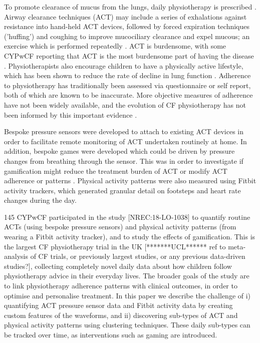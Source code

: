 \documentclass{article}
\begin{document}
To promote clearance of mucus from the lungs, daily physiotherapy is prescribed \cite{Daniels2017}. Airway clearance techniques (ACT) may include a series of  exhalations against resistance into hand-held ACT devices, followed by forced expiration techniques ('huffing') and coughing to improve mucociliary clearance and expel mucous; an exercise which is performed repeatedly \cite{Villanuevaj4574}. ACT is burdensome, with some CYPwCF reporting that ACT is the most burdensome part of having the disease \cite{JamesLindAlliance}. Physiotherapists also encourage children to have a physically active lifestyle, which has been shown to reduce the rate of decline in lung function \cite{Williams2014}. Adherence to physiotherapy has traditionally been assessed via questionnaire or self report, both of which are known to be inaccurate. More objective measures of adherence  have not been widely available, and the evolution of CF physiotherapy has not been informed by this important evidence \cite{Modi2006}.  

Bespoke pressure sensors were developed to attach to existing ACT devices in order to facilitate remote monitoring of ACT undertaken routinely at home. In addition, bespoke games were developed which could be driven by pressure changes from breathing through the sensor. This was in order to investigate if gamification might reduce the treatment burden of ACT or modify ACT adherence or patterns \cite{Jackson2019} \cite{[Anonymised]2019} . Physical activity patterns were also measured using Fitbit activity trackers, which generated granular detail on footsteps and heart rate changes during the day. 

 145 CYPwCF participated in the study [NREC:18-LO-1038] to quantify routine ACTs (using bespoke pressure sensors) and physical activity patterns (from wearing a Fitbit activity tracker), and to study the effects of gamification. This is the largest CF physiotherapy trial in the UK [*******UCL****** ref to meta-analysis of CF trials, or previously largest studies, or any previous data-driven studies?], collecting completely novel daily data about how children follow physiotherapy advice in their everyday lives. The broader goals of the study are to link physiotherapy adherence patterns with clinical outcomes, in order to optimise and personalise treatment. In this paper we describe the challenge of i) quantifying ACT pressure sensor data and Fitbit activity data by creating custom features of the waveforms, and ii) discovering sub-types of ACT and physical activity patterns using clustering techniques. These daily sub-types can be tracked over time, as interventions such as gaming are introduced.  
 
\end{document}
